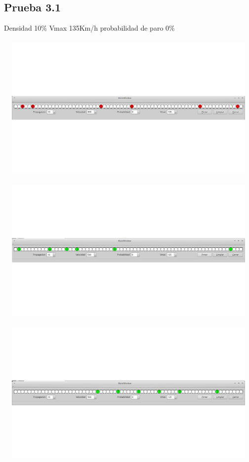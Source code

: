 \documentclass[a4paper,10pt]{article}
\begin{document}
\subsection{Prueba 3.1}
Densidad 10\% Vmax 135Km/h probabilidad de paro 0\%
\\ \\
\includegraphics[width=15cm, height=7cm]{10}
\\ \\
\includegraphics[width=15cm, height=7cm]{11}
\\ \\
\includegraphics[width=15cm, height=7cm]{12}
\end{document}
